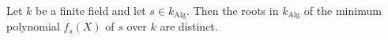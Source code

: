 Let $k$ be a finite field and let $s \in k_{\text{Alg}}$. Then the roots in $k_{\text{Alg}}$ of the minimum polynomial $f_s(X)$ of $s$ over $k$ are distinct.
